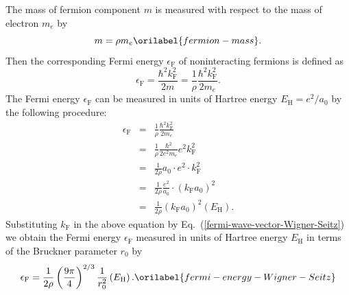 \documentclass[aps,showkeys,noshowpacs,superscriptaddress,pre,preprint]{revtex4-2}
\let\label\orilabel
\begin{document}
The mass of fermion component $m$ is measured with respect to the mass of electron $m_e$ by
\begin{equation}
m = \rho m_e
\label{fermion-mass} .
\end{equation}
Then the corresponding Fermi energy $\epsilon_\mathrm{F}$ of noninteracting fermions is defined as
\begin{equation*}
\epsilon_\mathrm{F} = \frac{\hbar^2 k_\mathrm{F}^2}{2m} = \frac{1}{\rho} \frac{\hbar^2 k_\mathrm{F}^2}{2 m_e} .
\end{equation*}
The Fermi energy $\epsilon_\mathrm{F}$ can be measured in units of Hartree energy $E_\mathrm{H} = e^2 / a_0$ 
by the following procedure:
\begin{eqnarray}
\epsilon_\mathrm{F} &=&  \frac{1}{\rho} \frac{\hbar^2 k_\mathrm{F}^2}{2 m_e}
\nonumber \\
&=& \frac{1}{\rho} \frac{\hbar^2}{2 e^2 m_e} e^2 k_\mathrm{F}^2
\nonumber \\
&=& \frac{1}{2\rho} a_0 \cdot e^2 \cdot k_\mathrm{F}^2
\nonumber \\
&=& \frac{1}{2\rho} \frac{e^2}{a_0} \cdot \left( k_\mathrm{F} a_0 \right)^2
\nonumber \\
&=& \frac{1}{2\rho} \left( k_\mathrm{F} a_0 \right)^2 \left( E_\mathrm{H} \right) .
\nonumber 
\end{eqnarray}
Substituting $k_\mathrm{F}$ in the above equation by Eq.~(\ref{fermi-wave-vector-Wigner-Seitz})
we obtain the Fermi energy $\epsilon_\mathrm{F}$ measured 
in units of Hartree energy $E_\mathrm{H}$ 
in terms of the Bruckner parameter $r_0$ by
\begin{equation}
\epsilon_\mathrm{F} = \frac{1}{2\rho} \left( \frac{9\pi}{4} \right)^{2/3} \frac{1}{r_0^2} \left( E_\mathrm{H} \right) .
\label{fermi-energy-Wigner-Seitz}
\end{equation}
\end{document}
